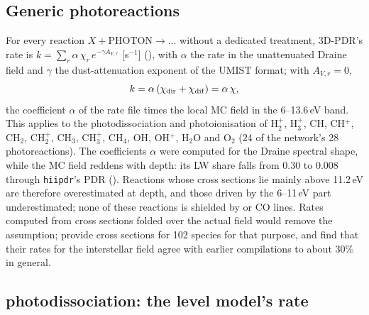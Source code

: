 \subsection{Generic photoreactions}
\label{sec:generic}

For every reaction $X+\mathrm{PHOTON}\to\ldots$ without a dedicated treatment,
3D-PDR's rate is $k=\sum_r\alpha\,\chi_r\,e^{-\gamma A_{V,r}}$ [s$^{-1}$]
(), with $\alpha$ the rate in the
unattenuated Draine field and $\gamma$ the dust-attenuation exponent of the UMIST
format; with $A_{V,r}=0$,
\begin{equation}
  k = \alpha\,(\chi_{\mathrm{dir}}+\chi_{\mathrm{dif}}) = \alpha\,\chi ,
  \label{eq:generic}
\end{equation}
the coefficient $\alpha$ of the rate file times the local MC field in the
6--13.6\,eV band. This applies to the photodissociation and photoionisation of
H$_2^+$, H$_3^+$, CH, CH$^+$, CH$_2$, CH$_2^+$, CH$_3$, CH$_3^+$, CH$_4$, OH,
OH$^+$, H$_2$O and O$_2$ (24 of the network's 28 photoreactions). The
coefficients $\alpha$ were computed for the Draine spectral shape, while the
MC field reddens with depth: its LW share falls from 0.30 to 0.008 through
\texttt{hiipdr}'s PDR (). Reactions whose cross sections lie mainly
above 11.2\,eV are therefore overestimated at depth, and those driven by the
6--11\,eV part underestimated; none of these reactions is shielded by \Htwo{}
or CO lines. Rates computed from cross sections folded over the actual field
would remove the assumption; \citet{Heays2017} provide cross sections for 102
species for that purpose, and find that their rates for the interstellar field
agree with earlier compilations to about 30\% in general.

\subsection{\texorpdfstring{\Htwo}{H2} photodissociation: the level model's rate}
\label{sec:h2rate}

